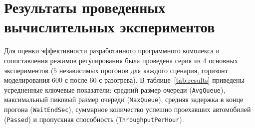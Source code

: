 \documentclass[11pt, a4paper]{article}
\begin{document}
\section{Результаты проведенных вычислительных экспериментов}
Для оценки эффективности разработанного программного комплекса и сопоставления режимов регулирования была проведена серия из 4 основных экспериментов ($5$ независимых прогонов для каждого сценария, горизонт моделирования $600\text{ с}$ после $60\text{ с}$ разогрева). В таблице~\ref{tab:results} приведены усредненные ключевые показатели: средний размер очереди (\texttt{AvgQueue}), максимальный пиковый размер очереди (\texttt{MaxQueue}), средняя задержка в конце прогона (\texttt{WaitEndSec}), суммарное количество успешно проехавших автомобилей (\texttt{Passed}) и пропускная способность (\texttt{ThroughputPerHour}).

\begin{table}[htbp]
  \centering
  \caption{Сводные результаты вычислительных экспериментов по сценариям}
  \label{tab:results}
  \small
\end{table}
\end{document}
